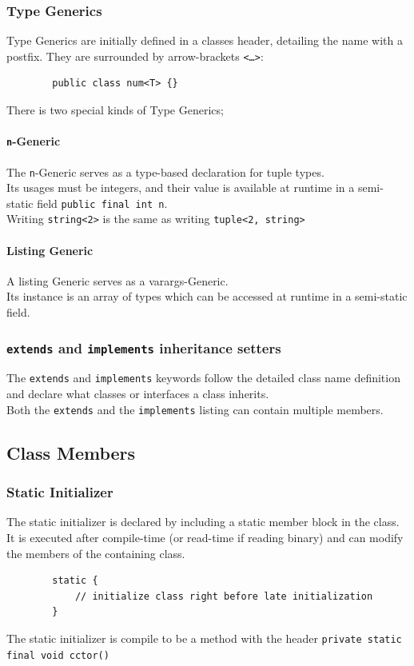 \documentclass{docs}
\begin{document}
    \subsubsection{Type Generics}
    Type Generics are initially defined in a classes header, detailing the name with a postfix.
    They are surrounded by arrow-brackets \texttt{<\dots>}:
    \begin{verbatim}
        public class num<T> {}
    \end{verbatim}
    There is two special kinds of Type Generics;
    
    \paragraph{\texttt{n}-Generic} The \texttt{n}-Generic serves as a type-based declaration for tuple types. \\
    Its usages must be integers, and their value is available at runtime in a semi-static field \texttt{public final int n}. \\
    Writing \texttt{string<2>} is the same as writing \texttt{tuple<2, string>}
    
    \paragraph{Listing Generic} A listing Generic serves as a varargs-Generic. \\
    Its instance is an array of types which can be accessed at runtime in a semi-static field.
    
    \subsubsection{\texttt{extends} and \texttt{implements} inheritance setters}
    The \texttt{extends} and \texttt{implements} keywords follow the detailed class name definition and declare what classes or interfaces a class inherits. \\
    Both the \texttt{extends} and the \texttt{implements} listing can contain multiple members.
    
    \subsection{Class Members}
    
    \subsubsection{Static Initializer}
    The static initializer is declared by including a static member block in the class. \\
    It is executed after compile-time (or read-time if reading binary) and can modify the members of the containing class.
    \begin{verbatim}
        static {
            // initialize class right before late initialization
        }
    \end{verbatim}
    The static initializer is compile to be a method with the header \texttt{private static final void cctor()}
    
\end{document}
